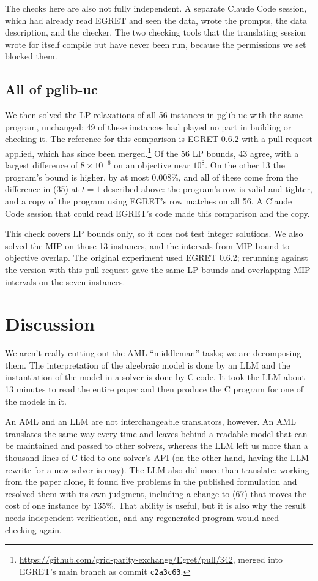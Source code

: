 \documentclass[11pt]{article}
\begin{document}
The checks here are also not fully independent. A separate Claude Code session, which had already read EGRET and seen the data, wrote the prompts, the data description, and the checker. The two checking tools that the translating session wrote for itself compile but have never been run, because the permissions we set blocked them.

\subsection{All of pglib-uc}
\label{sec:allpglib}

We then solved the LP relaxations of all 56 instances in pglib-uc with the same program, unchanged; 49 of these instances had played no part in building or checking it. The reference for this comparison is EGRET 0.6.2 with a pull request applied, which has since been merged.\footnote{\url{https://github.com/grid-parity-exchange/Egret/pull/342}, merged into EGRET's main branch as commit \texttt{c2a3c63}.} Of the 56 LP bounds, 43 agree, with a largest difference of $8\times 10^{-6}$ on an objective near $10^8$. On the other 13 the program's bound is higher, by at most 0.008\%, and all of these come from the difference in (35) at $t=1$ described above: the program's row is valid and tighter, and a copy of the program using EGRET's row matches on all 56. A Claude Code session that could read EGRET's code made this comparison and the copy.

This check covers LP bounds only, so it does not test integer solutions. We also solved the MIP on those 13 instances, and the intervals from MIP bound to objective overlap. The original experiment used EGRET 0.6.2; rerunning against the version with this pull request gave the same LP bounds and overlapping MIP intervals on the seven instances.

\section{Discussion \label{sec:discussion}}

We aren't really cutting out the AML ``middleman'' tasks; we are
decomposing them. The interpretation of the algebraic model is done by
an LLM and the instantiation of the model in a solver is done by C
code. It took the LLM about 13 minutes to read the entire paper and then
produce the C program for one of the models in it.

An AML and an LLM are not interchangeable translators, however. An AML
translates the same way every time and leaves behind a readable model
that can be maintained and passed to other solvers, whereas the LLM
left us more than a thousand lines of C tied to one solver's API (on the
other hand, having the LLM rewrite for a new solver is easy). The
LLM also did more than translate: working from the paper alone, it
found five problems in the published formulation and resolved them
with its own judgment, including a change to (67) that moves the cost
of one instance by 135\%. That ability is useful, but it is also why
the result needs independent verification, and any regenerated program
would need checking again. 
\end{document}
